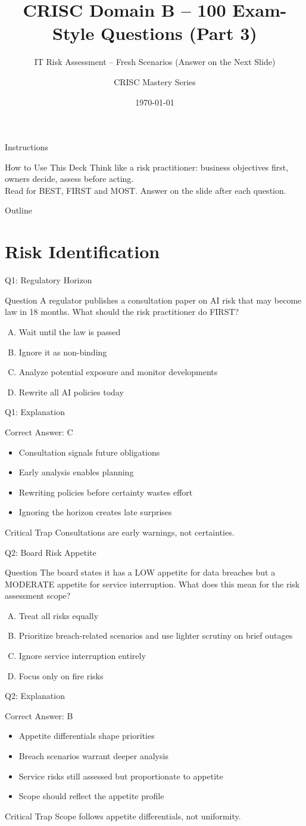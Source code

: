 \documentclass[aspectratio=169]{beamer}
\title{CRISC Domain B -- 100 Exam-Style Questions (Part 3)}
\subtitle{IT Risk Assessment -- Fresh Scenarios (Answer on the Next Slide)}
\author{CRISC Mastery Series}
\date{\today}
\newcommand{\hq}[7]{%
	\begin{frame}{Q#1: #2}
		\begin{block}{Question}
			#3
		\end{block}
		\begin{enumerate}[(A)]
			#4
		\end{enumerate}
	\end{frame}
	\begin{frame}{Q#1: Explanation}
		\begin{block}{Correct Answer: #5}
			\begin{itemize}
				#6
			\end{itemize}
		\end{block}
		\begin{alertblock}{Critical Trap}
			#7
		\end{alertblock}
	\end{frame}
}
\begin{document}
	
	\begin{frame}\titlepage\end{frame}
	
	\begin{frame}{Instructions}
		\begin{alertblock}{How to Use This Deck}
			Think like a risk practitioner: business objectives first, owners decide, assess before acting.\\
			Read for BEST, FIRST and MOST. Answer on the slide after each question.
		\end{alertblock}
	\end{frame}
	
	\begin{frame}{Outline}
		\tableofcontents
	\end{frame}
	
	\section{Risk Identification}
	
	\hq{1}{Regulatory Horizon}
	{A regulator publishes a consultation paper on AI risk that may become law in 18 months. What should the risk practitioner do FIRST?}
	{\item Wait until the law is passed
		\item Ignore it as non-binding
		\item Analyze potential exposure and monitor developments
		\item Rewrite all AI policies today}
	{C}
	{\item Consultation signals future obligations
		\item Early analysis enables planning
		\item Rewriting policies before certainty wastes effort
		\item Ignoring the horizon creates late surprises}
	{Consultations are early warnings, not certainties.}
	
	\hq{2}{Board Risk Appetite}
	{The board states it has a LOW appetite for data breaches but a MODERATE appetite for service interruption. What does this mean for the risk assessment scope?}
	{\item Treat all risks equally
		\item Prioritize breach-related scenarios and use lighter scrutiny on brief outages
		\item Ignore service interruption entirely
		\item Focus only on fire risks}
	{B}
	{\item Appetite differentials shape priorities
		\item Breach scenarios warrant deeper analysis
		\item Service risks still assessed but proportionate to appetite
		\item Scope should reflect the appetite profile}
	{Scope follows appetite differentials, not uniformity.}
	
\end{document}
